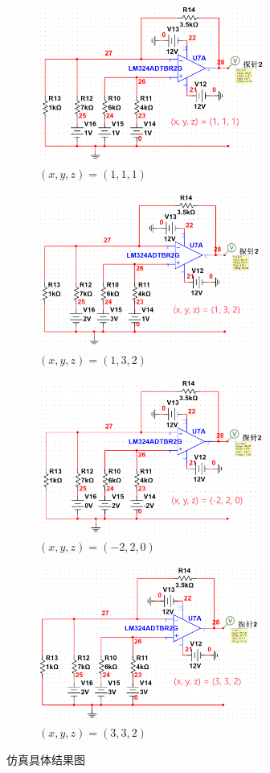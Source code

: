 \documentclass[UTF8]{report}
\theoremstyle{MyLineTheoremStyle} %
\theoremstyle{MyBlockTheoremStyle} %
\theoremstyle{MySubsubsectionStyle} %
\begin{document}
\begin{figure}[H]\centering
\begin{subfigure}[t]{0.48\textwidth}\centering
    \includegraphics[height=145pt]{assets/3/111.png}
    \caption{ $(x,y,z) = (1,1,1)$ }
\end{subfigure}\begin{subfigure}[t]{0.48\textwidth}\centering
    \includegraphics[height=145pt]{assets/3/132.png}
    \caption{ $(x,y,z) = (1,3,2)$ }
\end{subfigure}
\begin{subfigure}[t]{0.48\textwidth}\centering
    \includegraphics[height=145pt]{assets/3/91f965079537c7c35944182511dce291.png}
    \caption{ $(x,y,z) = (-2,2,0)$ }
\end{subfigure}\begin{subfigure}[t]{0.48\textwidth}\centering
    \includegraphics[height=145pt]{assets/3/def5c414621689edf67e4afb5251cf4a.png}
    \caption{ $(x,y,z) = (3,3,2)$ }
\end{subfigure}
\caption{ 仿真具体结果图 }\label{一个图}
\end{figure}
\end{document}
